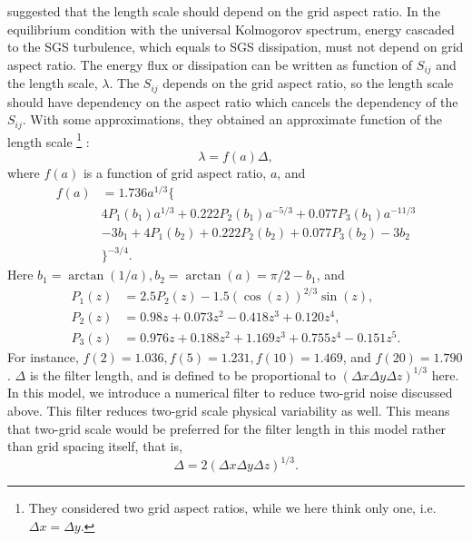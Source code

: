 \citet{Scotti_1993} suggested that the length scale should depend on the grid aspect ratio.
In the equilibrium condition with the universal Kolmogorov spectrum, energy cascaded to the SGS turbulence, which equals to SGS dissipation, must not depend on grid aspect ratio.
The energy flux or dissipation can be written as function of $S_{ij}$ and the length scale, $\lambda$.
The $S_{ij}$ depends on the grid aspect ratio, so the length scale should have dependency on the aspect ratio which cancels the dependency of the $S_{ij}$.
With some approximations, they obtained an approximate function of the length scale
\footnote{They considered two grid aspect ratios, while we here think only one, i.e. $\Delta x = \Delta y$.}
:
\begin{equation}
\lambda = f(a) \Delta,
\end{equation}
where $f(a)$ is a function of grid aspect ratio, $a$, and
\begin{align}
  f(a) &= 1.736 a^{1/3} \{ \nonumber\\
  & 4P_1(b_1)a^{1/3} + 0.222P_2(b_1)a^{-5/3} + 0.077P_3(b_1)a^{-11/3} \nonumber\\
  & - 3b_1 + 4P_1(b_2) + 0.222P_2(b_2) + 0.077P_3(b_2)- 3b_2 \nonumber\\
  & \}^{-3/4}. \label{eq: f}
\end{align}
Here $b_1 = \arctan(1/a), b_2 = \arctan(a) = \pi/2 - b_1$, and
\begin{align}
  P_1(z) &= 2.5P_2(z) - 1.5 (\cos(z))^{2/3} \sin(z), \\
  P_2(z) &= 0.98z + 0.073z^2 -0.418z^3 + 0.120z^4, \\
  P_3(z) &= 0.976z + 0.188z^2 + 1.169z^3 + 0.755z^4 - 0.151z^5.
\end{align}
For instance, $f(2) = 1.036, f(5) = 1.231, f(10) = 1.469$, and $f(20) = 1.790$.
$\Delta$ is the filter length, and is defined to be proportional to $(\Delta x \Delta y \Delta z)^{1/3}$ here.
In this model, we introduce a numerical filter to reduce two-grid noise discussed above.
This filter reduces two-grid scale physical variability as well.
This means that two-grid scale would be preferred for the filter length in this model rather than grid spacing itself, that is,
\begin{equation}
  \Delta = 2 (\Delta x \Delta y \Delta z)^{1/3}. \label{eq: delta}
\end{equation}



